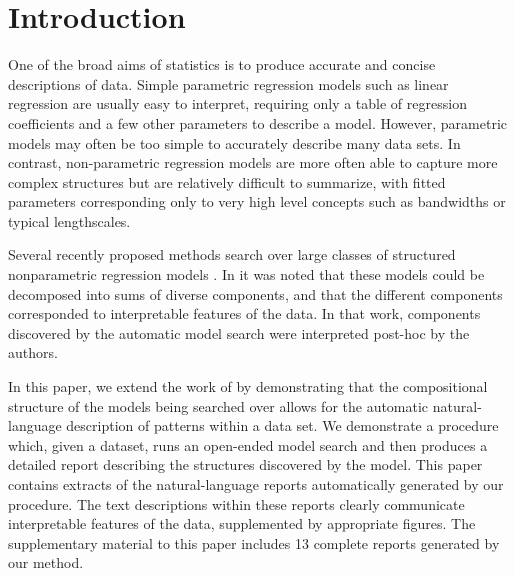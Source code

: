 \documentclass{article}
\def\ie{i.e.\ }
\def\eg{e.g.\ }
\begin{document}
\allowdisplaybreaks

\section{Introduction}
One of the broad aims of statistics is to produce accurate and concise descriptions of data.
Simple parametric regression models such as linear regression are usually easy to interpret, requiring only a table of regression coefficients and a few other parameters to describe a model.
However, parametric models may often be too simple to accurately describe many data sets.
In contrast, non-parametric regression models are more often able to capture more complex structures but are relatively difficult to summarize, with fitted parameters corresponding only to very high level concepts such as bandwidths or typical lengthscales.

Several recently proposed methods search over large classes of structured nonparametric regression models \citep[e.g.][]{diosan2007evolving, bing2010gp, DuvLloGroetal13, kronberger2013evolution}.
In \cite{DuvLloGroetal13} it was noted that these models could be decomposed into sums of diverse components, and that the different components corresponded to interpretable features of the data.
In that work, components discovered by the automatic model search were interpreted post-hoc by the authors.

In this paper, we extend the work of \cite{DuvLloGroetal13} by demonstrating that the compositional structure of the models being searched over allows for the automatic natural-language description of patterns within a data set.
We demonstrate a procedure which, given a dataset, runs an open-ended model search and then produces a detailed report describing the structures discovered by the model. %
%
This paper contains extracts of the natural-language reports automatically generated by our procedure.
The text descriptions within these reports clearly communicate interpretable features of the data, supplemented by appropriate figures.
The supplementary material to this paper includes 13 complete reports generated by our method.
\end{document}

